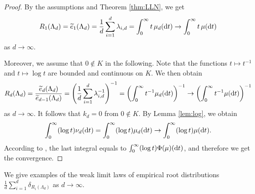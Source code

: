\documentclass[pdftex]{sigma}
\numberwithin{equation}{section}
\begin{document}
\begin{proof}
By the assumptions and Theorem \ref{thm:LLN}, we get
\begin{align*}
R_1(\Lambda_d)=\widetilde{e}_{1}(\Lambda_d)=\frac{1}{d} \sum_{i=1}^d \lambda_{i,d}=\int_0^\infty t\, \mu_d({\rm d}t)\rightarrow \int_0^\infty t \, \mu({\rm d}t)
\end{align*}
as $d\rightarrow\infty$.

Moreover, we assume that $0\notin K$ in the following.
Note that the functions
$t\mapsto t^{-1}$ and $t\mapsto \log t$ are  bounded and continuous on
$K$.
We then obtain
\begin{align*}
R_{d}(\Lambda_d)=\frac{\widetilde{e}_{d}(\Lambda_d)}{\widetilde{e}_{d-1} (\Lambda_d)}=\left(\frac{1}{d} \sum_{i=1}^{d} \lambda_{i,d}^{-1} \right)^{-1}=\left(\int_0^\infty t^{-1}\mu_d({\rm d}t)\right)^{-1}\rightarrow \left(\int_0^\infty t^{-1}\mu({\rm d}t)\right)^{-1}
\end{align*}
as $d\rightarrow\infty$.
It follows that $k_d=0$ from $0\notin K$.
By Lemma \ref{lem:log}, we obtain
\begin{align*}
\int_0^\infty (\log t) \nu_d({\rm d}t)=\int_0^\infty (\log t) \mu_d({\rm d}t)\rightarrow \int_0^\infty (\log t) \mu({\rm d}t).
\end{align*}
According to \cite[Proposition 1]{HM13}, the last integral equals to $\int_0^\infty (\log t) \Phi(\mu)({\rm d}t)$, and therefore we get the convergence.
\end{proof}

We give examples of the weak limit laws of empirical root distributions $\frac{1}{d}\sum_{i=1}^d \delta_{R_i(\Lambda_d)}$ as $d\rightarrow\infty$.
\end{document}

